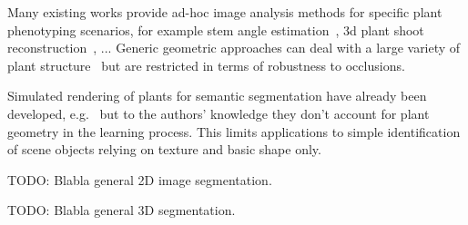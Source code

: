 Many existing works provide ad-hoc image analysis methods for specific plant
phenotyping scenarios, for example stem angle
estimation~\cite{das2017automated}, 3d plant shoot
reconstruction~\cite{scharr2017fast}, ... Generic geometric approaches can deal
with a large variety of plant structure~\cite{reeb2018quantification} but are restricted in terms of robustness to
occlusions.

Simulated rendering of plants for semantic segmentation have already
been developed, e.g.~\cite{duboudin_toward_2019} but to the authors' knowledge
they don't account for plant geometry in the learning process. This limits applications
to simple identification of scene objects relying on texture and basic shape only.

TODO: Blabla general 2D image segmentation.

TODO: Blabla general 3D segmentation.

